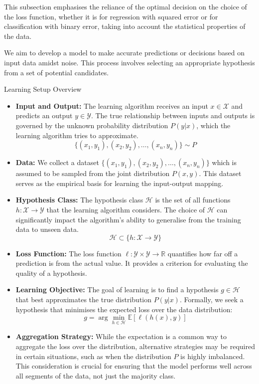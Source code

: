 This subsection emphasises the reliance of the optimal decision on the choice of the loss function, whether it is for regression with squared error or for classification with binary error, taking into account the statistical properties of the data.


We aim to develop a model to make accurate predictions or decisions based on input data amidst noise. This process involves selecting an appropriate hypothesis from a set of potential candidates. 

\begin{definitionbox}{Learning Setup Overview}
    

\begin{itemize}
    \item \textbf{Input and Output:} The learning algorithm receives an input \( x \in \mathcal{X} \) and predicts an output \( y \in \mathcal{Y} \). The true relationship between inputs and outputs is governed by the unknown probability distribution \( P(y|x) \), which the learning algorithm tries to approximate.
    $$ \{(x_1, y_1), (x_2, y_2), \ldots, (x_n, y_n)\}  \sim P$$
    
    \item \textbf{Data:} We collect a dataset \( \{(x_1, y_1), (x_2, y_2), \ldots, (x_n, y_n)\} \) which is assumed to be sampled from the joint distribution \( P(x, y) \). This dataset serves as the empirical basis for learning the input-output mapping.
    
    \item \textbf{Hypothesis Class:} The hypothesis class \( \mathcal{H} \) is the set of all functions \( h: \mathcal{X} \rightarrow \mathcal{Y} \) that the learning algorithm considers. The choice of \( \mathcal{H} \) can significantly impact the algorithm's ability to generalise from the training data to unseen data.
    $$
    \mathcal{H} \subset \{h:\mathcal{X} \rightarrow \mathcal{Y}\}
    $$
    
    \item \textbf{Loss Function:} The loss function \( \ell: \mathcal{Y} \times \mathcal{Y} \rightarrow \mathbb{R} \) quantifies how far off a prediction is from the actual value. It provides a criterion for evaluating the quality of a hypothesis.
    
    \item \textbf{Learning Objective:} The goal of learning is to find a hypothesis \( g \in \mathcal{H} \) that best approximates the true distribution \( P(y|x) \). Formally, we seek a hypothesis that minimises the expected loss over the data distribution: 
    $$ g = \arg\min_{h \in \mathcal{H}} \mathbb{E}[\ell(h(x), y)] $$
    
    \item \textbf{Aggregation Strategy:} While the expectation is a common way to aggregate the loss over the distribution, alternative strategies may be required in certain situations, such as when the distribution \( P \) is highly imbalanced. This consideration is crucial for ensuring that the model performs well across all segments of the data, not just the majority class.
\end{itemize}

\end{definitionbox}

